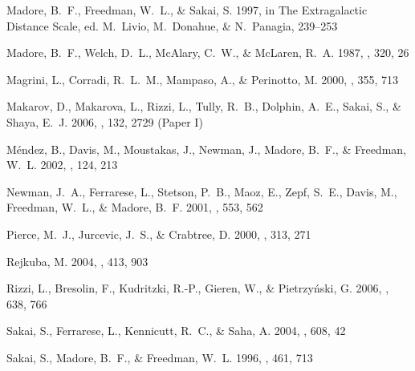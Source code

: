 \documentclass[11pt,preprint2]{aastex}
\begin{document}
\begin{thebibliography}{55}
{Madore}, B.~F., {Freedman}, W.~L., \& {Sakai}, S. 1997, in The Extragalactic
  Distance Scale, ed. M.~{Livio}, M.~{Donahue}, \& N.~{Panagia}, 239--253

{Madore}, B.~F., {Welch}, D.~L., {McAlary}, C.~W., \& {McLaren}, R.~A. 1987,
  \apj, 320, 26

{Magrini}, L., {Corradi}, R.~L.~M., {Mampaso}, A., \& {Perinotto}, M. 2000,
  \aap, 355, 713

{Makarov}, D., {Makarova}, L., {Rizzi}, L., {Tully}, R.~B., {Dolphin}, A.~E.,
  {Sakai}, S., \& {Shaya}, E.~J. 2006, \aj, 132, 2729 (Paper I)

{M{\'e}ndez}, B., {Davis}, M., {Moustakas}, J., {Newman}, J., {Madore}, B.~F.,
  \& {Freedman}, W.~L. 2002, \aj, 124, 213

{Newman}, J.~A., {Ferrarese}, L., {Stetson}, P.~B., {Maoz}, E., {Zepf}, S.~E.,
  {Davis}, M., {Freedman}, W.~L., \& {Madore}, B.~F. 2001, \apj, 553, 562

{Pierce}, M.~J., {Jurcevic}, J.~S., \& {Crabtree}, D. 2000, \mnras, 313, 271

{Rejkuba}, M. 2004, \aap, 413, 903

{Rizzi}, L., {Bresolin}, F., {Kudritzki}, R.-P., {Gieren}, W., \&
  {Pietrzy{\'n}ski}, G. 2006, \apj, 638, 766

{Sakai}, S., {Ferrarese}, L., {Kennicutt}, R.~C., \& {Saha}, A. 2004, \apj,
  608, 42

{Sakai}, S., {Madore}, B.~F., \& {Freedman}, W.~L. 1996, \apj, 461, 713


\end{thebibliography}
\end{document}
